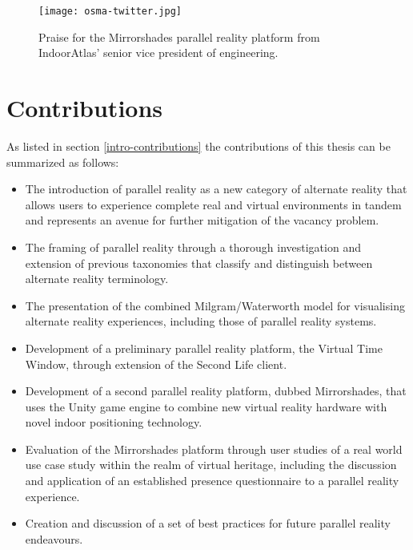 \begin{figure}[t]
	\begin{center}
		\texttt{[image: osma-twitter.jpg]}
		\caption{Praise for the Mirrorshades parallel reality platform from IndoorAtlas' senior vice president of engineering.}
		\label{osma-twitter.jpg}
	\end{center}	
\end{figure}


\section{Contributions}

As listed in section \ref{intro-contributions} the contributions of this thesis can be summarized as follows:

\begin{itemize}
	\item The introduction of parallel reality as a new category of alternate reality that allows users to experience complete real and virtual environments in tandem and represents an avenue for further mitigation of the vacancy problem.
	\item The framing of parallel reality through a thorough investigation and extension of previous taxonomies that classify and distinguish between alternate reality terminology.
	\item The presentation of the combined Milgram/Waterworth model for visualising alternate reality experiences, including those of parallel reality systems.
	\item Development of a preliminary parallel reality platform, the Virtual Time Window, through extension of the Second Life client.
	\item Development of a second parallel reality platform, dubbed Mirrorshades, that uses the Unity game engine to combine new virtual reality hardware with novel indoor positioning technology.
	\item Evaluation of the Mirrorshades platform through user studies of a real world use case study within the realm of virtual heritage, including the discussion and application of an established presence questionnaire to a parallel reality experience.
	\item Creation and discussion of a set of best practices for future parallel reality endeavours.
\end{itemize}

